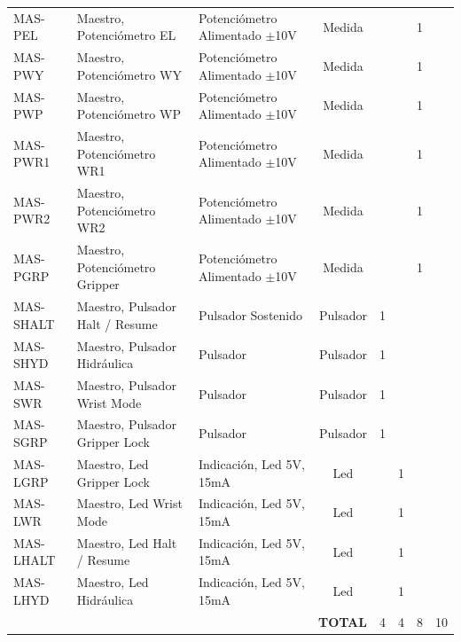 \begin{table}
\begin{tabular}{lllccccc}
    MAS-PEL & Maestro, Potenciómetro EL & Potenciómetro Alimentado $\pm$10V & Medida &       &       & 1     &  \\
    MAS-PWY & Maestro, Potenciómetro WY & Potenciómetro Alimentado $\pm$10V & Medida &       &       & 1     &  \\
    MAS-PWP & Maestro, Potenciómetro WP & Potenciómetro Alimentado $\pm$10V & Medida &       &       & 1     &  \\
    MAS-PWR1 & Maestro, Potenciómetro WR1 & Potenciómetro Alimentado $\pm$10V & Medida &       &       & 1     &  \\
    MAS-PWR2 & Maestro, Potenciómetro WR2 & Potenciómetro Alimentado $\pm$10V & Medida &       &       & 1     &  \\
    MAS-PGRP & Maestro, Potenciómetro Gripper & Potenciómetro Alimentado $\pm$10V & Medida &       &       & 1     &  \\
    MAS-SHALT & Maestro, Pulsador Halt / Resume & Pulsador Sostenido & Pulsador & 1     &       &       &  \\
    MAS-SHYD & Maestro, Pulsador Hidráulica & Pulsador & Pulsador & 1     &       &       &  \\
    MAS-SWR & Maestro, Pulsador Wrist Mode & Pulsador & Pulsador & 1     &       &       &  \\
    MAS-SGRP & Maestro, Pulsador Gripper Lock & Pulsador & Pulsador & 1     &       &       &  \\
    MAS-LGRP & Maestro, Led Gripper Lock & Indicación, Led 5V, 15mA & Led   &       & 1     &       &  \\
    MAS-LWR & Maestro, Led Wrist Mode & Indicación, Led 5V, 15mA & Led   &       & 1     &       &  \\
    MAS-LHALT & Maestro, Led Halt / Resume & Indicación, Led 5V, 15mA & Led   &       & 1     &       &  \\
    MAS-LHYD & Maestro, Led Hidráulica & Indicación, Led 5V, 15mA & Led   &       & 1     &       &  \\
    \hline
    \multicolumn{4}{r}{\textbf{TOTAL}} & 4 & 4 & 8 & 10 \\
    \hline
    \end{tabular}%
  \label{tab:signalsMaster}%
\end{table}%



